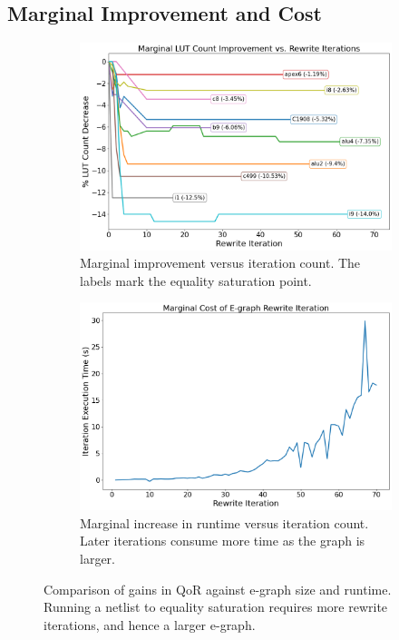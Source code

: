\subsection{Marginal Improvement and Cost}\label{sec:results:margin}
\begin{figure}
    \begin{subfigure}{0.47\textwidth}
        \centering
        \includegraphics[width=\textwidth]{img/improvement.png}
        \caption{Marginal improvement versus iteration count. The labels mark the equality saturation point.}\label{fig:marginal:improvement}
    \end{subfigure}
    \hfill\vspace{4mm}
    \begin{subfigure}{0.47\textwidth}
        \centering
        \includegraphics[width=\textwidth]{img/runtime_derivative.png}
        \caption{Marginal increase in runtime versus iteration count. Later iterations consume more time as the graph is larger.}\label{fig:marginal:runtime}
    \end{subfigure}
    \caption{Comparison of gains in QoR against e-graph size and runtime. Running a netlist to equality saturation requires more rewrite iterations, and hence a larger e-graph.}\label{fig:marginal}
\end{figure}

